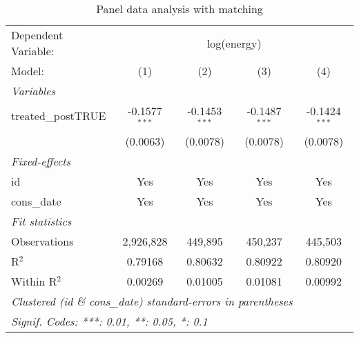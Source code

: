 
\begin{table}[htbp]
   \centering
   \caption{Panel data analysis with matching\label{tab:didmatch}}
   \begin{tabular}{lcccc}
      \tabularnewline\midrule\midrule
      Dependent Variable: & \multicolumn{4}{c}{log(energy)}\\
      Model:             & (1)             & (2)             & (3)             & (4)\\
      \midrule \emph{Variables} &   &   &   &  \\
      treated\_postTRUE & -0.1577$^{***}$ & -0.1453$^{***}$ & -0.1487$^{***}$ & -0.1424$^{***}$\\
                         & (0.0063)        & (0.0078)        & (0.0078)        & (0.0078)\\
      \midrule \emph{Fixed-effects} &   &   &   &  \\
      id                 & Yes             & Yes             & Yes             & Yes\\
      cons\_date        & Yes             & Yes             & Yes             & Yes\\
      \midrule \emph{Fit statistics} &   &   &   &  \\
      Observations       & 2,926,828       & 449,895         & 450,237         & 445,503\\
      R$^2$              & 0.79168         & 0.80632         & 0.80922         & 0.80920\\
      Within R$^2$       & 0.00269         & 0.01005         & 0.01081         & 0.00992\\
      \midrule\midrule\multicolumn{5}{l}{\emph{Clustered (id \& cons\_date) standard-errors in parentheses}}\\
      \multicolumn{5}{l}{\emph{Signif. Codes: ***: 0.01, **: 0.05, *: 0.1}}\\
   \end{tabular}
\end{table}


